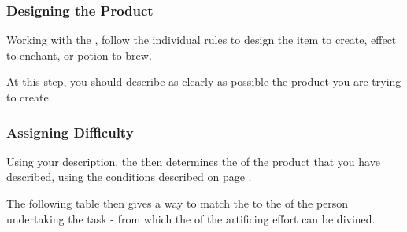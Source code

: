\subsubsection{Designing the Product}

Working with the , follow the individual  rules to design the item to create, effect to enchant, or potion to brew. 

At this step, you should describe as clearly as possible the product you are trying to create. 

\subsubsection{Assigning Difficulty}

Using your description, the  then determines the  of the product that you have described, using the  conditions described on page \pageref{S:ItemRarity}. 

The following table then gives a way to match the  to the  of the person undertaking the task - from which the  of the artificing effort can be divined.  


\newcommand\tHeader[1]{ \cc \imp{ #1} }
\newcommand\dvRow[7]{#1&#2&#3&#4&#5&#6&#7}

\newcommand\dvTable[7]
{
	\footnotesize
	\begin{center}
		\begin{rndtable}{@{} c r c c c c c c c @{}}
			~ & ~ & \multicolumn{7}{c}{\cc \small Artificing Ability} 
			\\
			\cc & \cc	&	\tHeader{1}	&	\tHeader{2}	&	\tHeader{3}	&	\tHeader{4}	&	\tHeader{5}	&	\tHeader{6}	&	\tHeader{7}
			\\
			\cc &  \tHeader{Abundant}	&	#1
			\\
			\cc & \tHeader{Common} 	&	#2
			\\
			\cc & \tHeader{Singular}	&	#3
			\\
			\cc & \tHeader{Unusual}	&	#4
			\\
			\cc & \tHeader{Rare}	&	#5
			\\
			\cc & \tHeader{Extraordinary}	&	#6
			\\
			\multirow{-7}{*}{\rotatebox[origin=c]{90}{\cc \bf \small Item Rarity} } & \tHeader{Mythical} & #7
		\end{rndtable}
	
	\end{center}
	\normalsize
}

